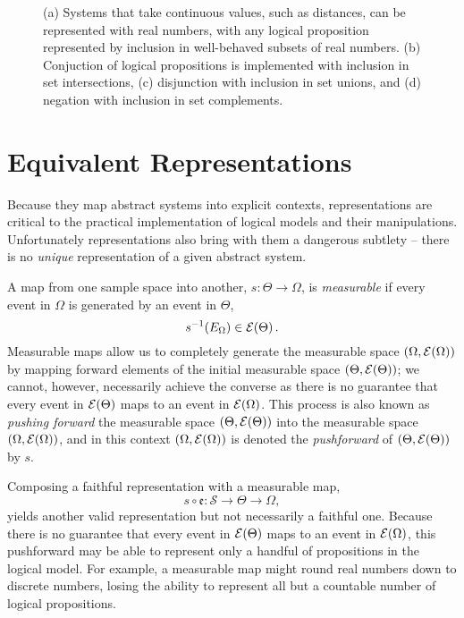 \begin{figure*}
{
}
\caption{(a) Systems that take continuous values, such as distances, 
can be represented with real numbers, with any logical proposition
represented by inclusion in well-behaved subsets of real numbers. 
(b) Conjuction of logical propositions is implemented with inclusion 
in set intersections, (c) disjunction with inclusion in set unions, and 
(d) negation with inclusion in set complements.}
\label{fig:real_set_logic}
\end{figure*}

\section{Equivalent Representations}

Because they map abstract systems into explicit contexts, representations
are critical to the practical implementation of logical models and their
manipulations.  Unfortunately representations also bring with them a 
dangerous subtlety -- there is no \emph{unique} representation of a 
given abstract system.

A map from one sample space into another, $s : \Theta \rightarrow \Omega$,
is \emph{measurable} if every event in $\Omega$ is generated by an event 
in $\Theta$,
%
\begin{equation*}
s^{-1} \! \left( E_{\Omega} \right) \in  \mathcal{E} \! \left( \Theta \right) .
\end{equation*}
%
Measurable maps allow us to completely generate the measurable space 
$\left( \Omega,  \mathcal{E} \! \left( \Omega \right)  \right)$ by mapping forward elements of the 
initial measurable space $\left(\Theta,  \mathcal{E} \! \left( \Theta \right)  \right)$; we cannot, 
however, necessarily achieve the converse as there is no guarantee that 
every event in $ \mathcal{E} \! \left( \Theta \right) $ maps to an event in $ \mathcal{E} \! \left( \Omega \right) $.
This process is also known as \emph{pushing forward} the measurable 
space $\left( \Theta,  \mathcal{E} \! \left( \Theta \right)  \right)$ into the measurable space 
$\left( \Omega,  \mathcal{E} \! \left( \Omega \right)  \right)$, and in this context  
$\left( \Omega,  \mathcal{E} \! \left( \Omega \right)  \right)$ is denoted the \emph{pushforward} 
of $\left( \Theta,  \mathcal{E} \! \left( \Theta \right)  \right)$ by $s$.

Composing a faithful representation with a measurable map,
%
\begin{equation*}
s \circ \mathfrak{e} : \mathcal{S} \rightarrow \Theta \rightarrow \Omega,
\end{equation*}
%
yields another valid representation but not necessarily a faithful one.
Because there is no guarantee that every event in $ \mathcal{E} \! \left( \Theta \right) $ maps
to an event in $ \mathcal{E} \! \left( \Omega \right) $, this pushforward may be able to represent
only a handful of propositions in the logical model.  For example,
a measurable map might round real numbers down to discrete numbers,
losing the ability to represent all but a countable number of logical 
propositions.

